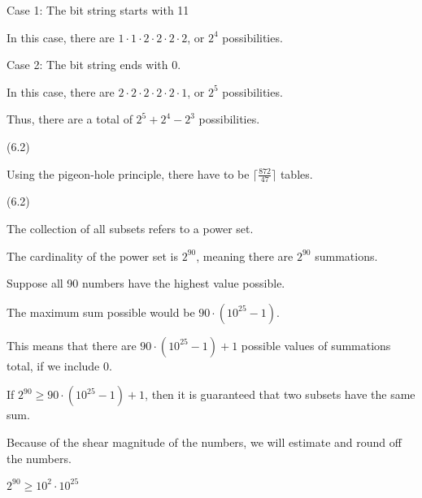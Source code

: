 \documentclass{exam}
\begin{document}
\begin{questions}
\begin{center}
Case 1: The bit string starts with 11

In this case, there are \(1 \cdot 1 \cdot 2 \cdot 2 \cdot 2 \cdot 2\), or \(2^4\) possibilities.
\vspace{5px}

Case 2: The bit string ends with 0.

In this case, there are \(2 \cdot 2 \cdot 2 \cdot 2 \cdot 2 \cdot 1\), or \(2^5\) possibilities.

\vspace{5px}

Thus, there are a total of \(2^5 + 2^4 - 2^3\) possibilities.

\end{center}

 (6.2)

\begin{center}

Using the pigeon-hole principle, there have to be \(\lceil \frac{872}{47} \rceil \) tables.

\end{center}

 (6.2)

\begin{center}

The collection of all subsets refers to a power set.

The cardinality of the power set is \(2^{90}\), meaning there are \(2^{90}\) summations.

Suppose all 90 numbers have the highest value possible.

The maximum sum possible would be \(90 \cdot (10^{25}-1)\).

This means that there are \(90 \cdot (10^{25} - 1) +1\) possible values of summations total, if we include 0.

If \(2^{90} \geq 90 \cdot (10^{25} - 1) + 1\), then it is guaranteed that two subsets have the same sum.

Because of the shear magnitude of the numbers, we will estimate and round off the numbers.

\(2^{90} \geq 10^2 \cdot 10^{25}\)


\end{center}
\end{questions}
\end{document}
